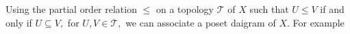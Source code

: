 \documentclass[12pt]{amsart}
\begin{document}
	Using the  partial order relation $\leq$ on a topology $\mathcal{T}$ of $X$ such that $U\leq V$ if and only if $U\subseteq V,$ for $U,V\in \mathcal{T},$ we can associate a poset daigram of $X$. For example
	
	


\end{document}
